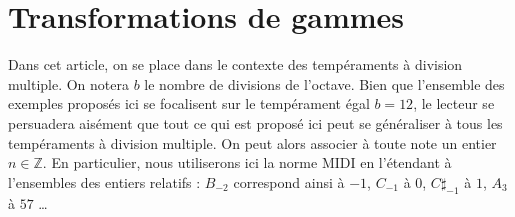 \documentclass{article}
\begin{document}
\section{Transformations de gammes}
\begin{comment}
  \subsection{Quelles transformations de gamme autoriser ?}
Les transformation affines de la forme $an + b$ où $n$ est la note de départ.
\subsection{Pourquoi ces transformations ?}
\begin{enumerate}
  \item Ces transformations sont adaptées à la musique tonale occidentale : passage du majeur au mineur.
  \item Elles sont facilement implémentables
  \item Elles peuvent être exprimées par une paire d'entiers, ce qui permet de les communiquer directement via MIDI.
\end{enumerate}


\subsection{Peut-on quand même sortir de la tonalité ?}
Oui : \begin{enumerate}
  \item on peut passer d'une gamme quelconque à une gamme par tons
  \item elles s'appliquent dans un contexte microtonal
  \item Possibilité d'ajouter une permutation quelconque personnalisée
\end{enumerate} 
\end{comment}
Dans cet article, on se place dans le contexte des tempéraments à division multiple. On notera $b$ le nombre de divisions de l'octave. Bien que l'ensemble des exemples proposés ici se focalisent sur le tempérament égal $b = 12$, le lecteur se persuadera aisément que tout ce qui est proposé ici peut se généraliser à tous les tempéraments à division multiple. On peut alors associer à toute note un entier $n\in \mathbb{Z}$. En particulier, nous utiliserons ici la norme MIDI en l'étendant à l'ensembles des entiers relatifs : $B_{-2}$ correspond ainsi à $-1$, $C_{-1}$ à $0$, $C\sharp_{-1}$  à $1$, $A_3$ à $57$ \dots
\end{document}
